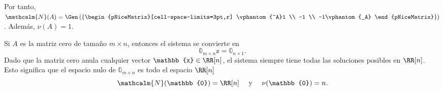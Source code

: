 \begin{examplebox}{}{}
\begin{matrizn}
    \end{matrizn}
    Por tanto, $\mathcalm{N}(A) = \Gen \left( \left\{ \begin{pNiceMatrix}[cell-space-limits=3pt,r]
        \vphantom{^A}1 \\
        -1 \\
        -1\vphantom{_A}
    \end{pNiceMatrix} \right\} \right)$. Además, $\nu(A) = 1$.
\end{examplebox}

Si $A$ es la matriz cero de tamaño $m \times n$, entonces el sistema se convierte en
$$\mathbb{0}_{m \times n} \mathbb{x} = \mathbb{0}_{n \times 1}.$$
Dado que la matriz cero anula cualquier vector $\mathbb{x} \in \RR[n]$, el sistema siempre tiene todas las soluciones posibles en $\RR[n]$. Esto significa que el espacio nulo de $\mathbb{0}_{m \times n}$ es todo el espacio $\RR[n]$
$$\mathcalm{N}(\mathbb{0}) = \RR[n] \quad \text{ y } \quad \nu(\mathbb{0}) = n.$$
\newpage

